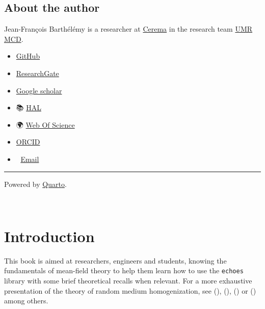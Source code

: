 \documentclass[
  letterpaper,
  DIV=11,
  numbers=noendperiod]{scrreprt}
\begin{document}
\section*{About the author}\label{about-the-author}


Jean-François Barthélémy is a researcher at
\href{https://www.cerema.fr/en}{Cerema} in the research team
\href{https://www.cerema.fr/fr/presse/dossier\%20cerema-universite-gustave-eiffel-creent-unite-mixte}{UMR
MCD}.

\begin{itemize}
\item
  \href{https://github.com/jfbarthelemy}{GitHub}
\item

  \href{https://www.researchgate.net/profile/Jean-Francois_Barthelemy}{ResearchGate}
\item

  \href{https://scholar.google.com/citations?user=RVjtCiAAAAAJ&hl=en}{Google
  scholar}
\item
  📚
  \href{https://hal.archives-ouvertes.fr/search/index/?q=\%2A&authIdHal_s=jfbarthelemy}{HAL}
\item
  🌍 \href{https://www.webofscience.com/wos/author/record/449919}{Web Of
  Science}
\item
  \href{https://orcid.org/0000-0002-1968-8939}{ORCID}
\item
  📩 \href{mailto:jf.barthelemy@cerema.fr}{Email}
\end{itemize}

\begin{center}\rule{0.5\linewidth}{0.5pt}\end{center}

Powered by \href{https://quarto.org/}{Quarto}.

\(\,\)


\chapter*{Introduction}\label{sec-intro}


This book is aimed at researchers, engineers and students, knowing the
fundamentals of mean-field theory to help them learn how to use the
\texttt{echoes} library with some brief theoretical recalls when
relevant. For a more exhaustive presentation of the theory of random
medium homogenization, see (), (),
() or
() among
others.
\end{document}
